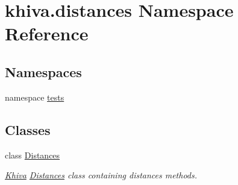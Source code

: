 \hypertarget{namespacekhiva_1_1distances}{}\section{khiva.\+distances Namespace Reference}
\label{namespacekhiva_1_1distances}
\subsection*{Namespaces}
\begin{DoxyCompactItemize}
\item 
namespace \mbox{\hyperlink{namespacekhiva_1_1distances_1_1tests}{tests}}
\end{DoxyCompactItemize}
\subsection*{Classes}
\begin{DoxyCompactItemize}
\item 
class \mbox{\hyperlink{classkhiva_1_1distances_1_1_distances}{Distances}}
\begin{DoxyCompactList}\small\item\em \mbox{\hyperlink{classkhiva_1_1_khiva}{Khiva}} \mbox{\hyperlink{classkhiva_1_1distances_1_1_distances}{Distances}} class containing distances methods. \end{DoxyCompactList}\end{DoxyCompactItemize}
